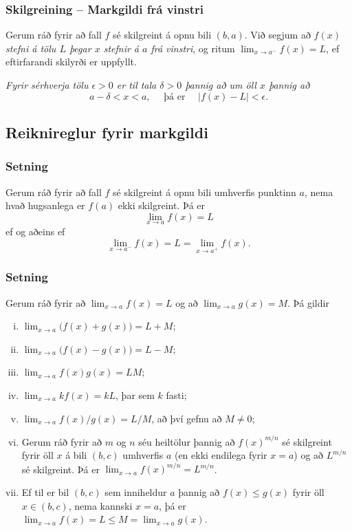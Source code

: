 \documentclass[icelandic,a4paper,12pt]{article}
\begin{document}
\pause

\subsubsection{Skilgreining -- Markgildi frá vinstri} Gerum ráð fyrir að fall $f$ sé
skilgreint á opnu bili $(b,a)$.  Við segjum að $f(x)$
{\it stefni á tölu $L$ þegar $x$ stefnir á $a$ frá vinstri}, og ritum
$\lim_{x\rightarrow a^-} f(x)=L$, ef eftirfarandi skilyrði er uppfyllt.

{\it Fyrir sérhverja tölu $\epsilon>0$ er til tala $\delta>0$ þannig
  að um öll $x$ þannig að} 
$$
a-\delta<x<a,\quad \text{ þá er } \quad |f(x)-L|<\epsilon.
$$

\subsection{Reiknireglur fyrir markgildi}
\subsubsection{Setning} Gerum ráð fyrir að fall $f$ sé
skilgreint á opnu bili umhverfis punktinn $a$, nema hvað hugsanlega er
$f(a)$ ekki skilgreint.  Þá er 
$$\lim_{x\rightarrow a} f(x)=L$$
ef og aðeins ef 
$$\lim_{x\rightarrow a^-} f(x)=L=\lim_{x\rightarrow a^+} f(x).$$

\subsubsection{Setning}   Gerum ráð fyrir að
$\lim_{x\rightarrow a}f(x)=L$ og að   $\lim_{x\rightarrow a}g(x)=M$.
Þá gildir

\begin{enumerate}[(i)]
  \item $\lim_{x\rightarrow a}\Big(f(x)+g(x)\Big)=L+M$;
  \item $\lim_{x\rightarrow a}\Big(f(x)-g(x)\Big)=L-M$;
  \item $\lim_{x\rightarrow a}f(x)g(x)=LM$;
  \item $\lim_{x\rightarrow a}kf(x)=kL$, þar sem $k$ fasti;
  \item $\lim_{x\rightarrow a}f(x)/g(x)=L/M$, að því gefnu að $M\neq 0$;
  \item Gerum ráð fyrir að $m$ og $n$ séu 
heiltölur þannig að $f(x)^{m/n}$ sé
skilgreint fyrir öll $x$ á bili $(b,c)$ umhverfis $a$ (en ekki
endilega fyrir $x=a$) og að $L^{m/n}$ sé skilgreint.
Þá er $\lim_{x\rightarrow a}f(x)^{m/n}=L^{m/n}$.
  \item Ef til er bil $(b,c)$ sem inniheldur $a$ þannig að 
$f(x)\leq g(x)$ fyrir öll $x\in (b,c)$, nema kannski $x=a$, þá er
$\lim_{x\rightarrow a}f(x)=L\leq M=\lim_{x\rightarrow a}g(x)$.
\end{enumerate}
\end{document}
